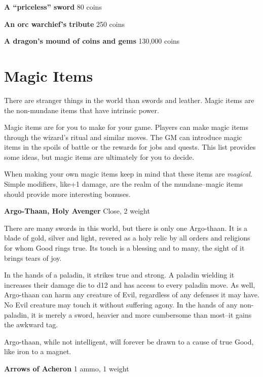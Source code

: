 {\noindent \bfseries A ``priceless'' sword} \hspace*{\fill} 80 coins

{\noindent \bfseries An orc warchief's tribute} \hspace*{\fill} 250 coins

{\noindent \bfseries A dragon's mound of coins and gems} \hspace*{\fill} 130,000 coins
\section*{Magic Items}

There are stranger things in the world than swords and leather. Magic items are the non-mundane items that have intrinsic power.

Magic items are for you to make for your game. Players can make magic items through the wizard's ritual and similar moves. The GM can introduce magic items in the spoils of battle or the rewards for jobs and quests. This list provides some ideas, but magic items are ultimately for you to decide.

When making your own magic items keep in mind that these items are \emph{magical}. Simple modifiers, like+1 damage, are the realm of the mundane--magic items should provide more interesting bonuses.

{\noindent \bfseries Argo-Thaan, Holy Avenger} \hspace*{\fill} Close, 2 weight

There are many swords in this world, but there is only one Argo-thaan. It is a blade of gold, silver and light, revered as a holy relic by all orders and religions for whom Good rings true. Its touch is a blessing and to many, the sight of it brings tears of joy.

In the hands of a paladin, it strikes true and strong. A paladin wielding it increases their damage die to d12 and has access to every paladin move. As well, Argo-thaan can harm any creature of Evil, regardless of any defenses it may have. No Evil creature may touch it without suffering agony. In the hands of any non-paladin, it is merely a sword, heavier and more cumbersome than most--it gains the awkward tag.

Argo-thaan, while not intelligent, will forever be drawn to a cause of true Good, like iron to a magnet.

{\noindent \bfseries Arrows of Acheron} \hspace*{\fill} 1 ammo, 1 weight

